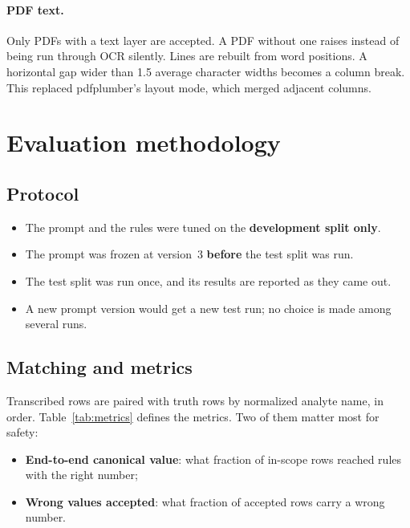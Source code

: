 \documentclass[11pt,a4paper]{article}
\newcommand{\code}[1]{\texttt{\detokenize{#1}}}
\begin{document}
\paragraph{PDF text.} Only PDFs with a text layer are accepted. A PDF without one raises \code{NoTextLayerError} instead of being run through OCR silently. Lines are rebuilt from word positions. A horizontal gap wider than 1.5 average character widths becomes a column break. This replaced pdfplumber's layout mode, which merged adjacent columns.

\section{Evaluation methodology}

\subsection{Protocol}
\begin{itemize}
  \item The prompt and the rules were tuned on the \textbf{development split only}.
  \item The prompt was frozen at version~3 \textbf{before} the test split was run.
  \item The test split was run once, and its results are reported as they came out.
  \item A new prompt version would get a new test run; no choice is made among several runs.
\end{itemize}

\subsection{Matching and metrics}
Transcribed rows are paired with truth rows by normalized analyte name, in order. Table~\ref{tab:metrics} defines the metrics. Two of them matter most for safety:
\begin{itemize}
  \item \textbf{End-to-end canonical value}: what fraction of in-scope rows reached rules with the right number;
  \item \textbf{Wrong values accepted}: what fraction of accepted rows carry a wrong number.
\end{itemize}
\end{document}
